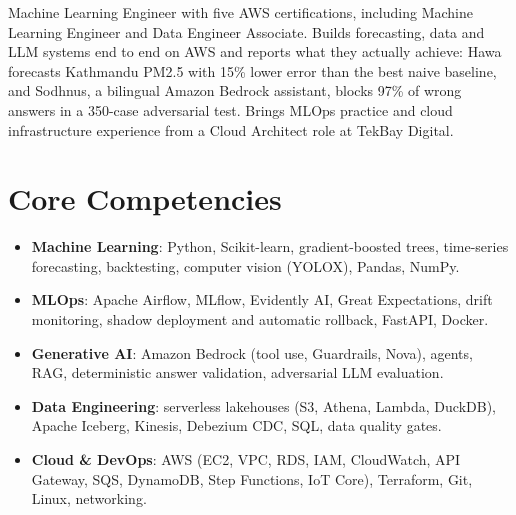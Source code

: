 \documentclass[11pt,a4paper,sans]{moderncv}
\begin{document}
\makecvtitle


\vspace{6pt}
\small{Machine Learning Engineer with five AWS certifications, including Machine Learning Engineer and Data Engineer Associate. Builds forecasting, data and LLM systems end to end on AWS and reports what they actually achieve: Hawa forecasts Kathmandu PM2.5 with 15\% lower error than the best naive baseline, and Sodhnus, a bilingual Amazon Bedrock assistant, blocks 97\% of wrong answers in a 350-case adversarial test. Brings MLOps practice and cloud infrastructure experience from a Cloud Architect role at TekBay Digital.}


\section{Core Competencies}
\vspace{1pt}
\begin{itemize}

\item \textbf{Machine Learning}: Python, Scikit-learn, gradient-boosted trees, time-series forecasting, backtesting, computer vision (YOLOX), Pandas, NumPy.

\item \textbf{MLOps}: Apache Airflow, MLflow, Evidently AI, Great Expectations, drift monitoring, shadow deployment and automatic rollback, FastAPI, Docker.

\item \textbf{Generative AI}: Amazon Bedrock (tool use, Guardrails, Nova), agents, RAG, deterministic answer validation, adversarial LLM evaluation.

\item \textbf{Data Engineering}: serverless lakehouses (S3, Athena, Lambda, DuckDB), Apache Iceberg, Kinesis, Debezium CDC, SQL, data quality gates.

\item \textbf{Cloud \& DevOps}: AWS (EC2, VPC, RDS, IAM, CloudWatch, API Gateway, SQS, DynamoDB, Step Functions, IoT Core), Terraform, Git, Linux, networking.

\end{itemize}
\end{document}
